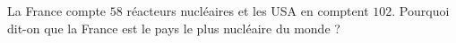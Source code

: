 
\begin{exercice}\label{exo2smath-0130}

    La France compte \( 58\) réacteurs nucléaires et les USA en comptent \( 102\). Pourquoi dit-on que la France est le pays le plus nucléaire du monde ?

\end{exercice}
